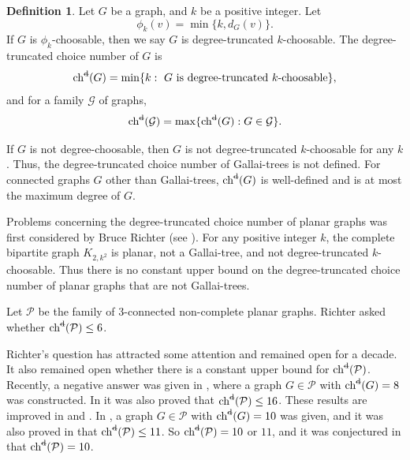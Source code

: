 \documentclass[11pt,a4paper]{article}
\theoremstyle{definition}
\newtheorem{definition}{Definition}
\begin{document}
 
 

 


\begin{definition}
    \label{def-degree-truncated}
    Let $G$ be a graph, and $k$ be a positive integer. Let 
$$\phi_k(v)=\min\{k, d_G(v)\}.$$
If  $G$ is  $\phi_k$-choosable, then we   say  $G$ is  degree-truncated $k$-choosable. 
    The  degree-truncated choice number of $G$ is 
$$\operatorname{ch}^{\text{\st{d}}}(G)= \min\{k:\text{ $G$ is degree-truncated  $k$-choosable}\},$$ 
and for 
a family  $ \mathcal{G}$ of graphs, $$\operatorname{ch}^{\text{\st{d}}}(\mathcal{G}) = \max \{\operatorname{ch}^{\text{\st{d}}}(G): G \in \mathcal{G}\}.$$
\end{definition}

 If $G$ is not degree-choosable, then $G$ is not degree-truncated $k$-choosable for any $k$. Thus, the degree-truncated choice number of Gallai-trees is not defined. For connected graphs $G$ other than Gallai-trees, $\operatorname{ch}^{\text{\st{d}}}(G)$ is well-defined and is at most the maximum degree of $G$.  

 
Problems concerning the degree-truncated choice number of planar graphs was first considered by Bruce Richter (see \cite{Hutchinson}). For any positive integer $k$, the complete bipartite graph $K_{2, k^2}$ is planar, not a Gallai-tree, and not degree-truncated $k$-choosable. Thus there is no constant upper bound on the degree-truncated choice number of planar graphs that are not Gallai-trees.  

Let $\mathcal{P}$ be the family of 3-connected non-complete planar graphs. Richter \cite{Hutchinson} asked whether $\operatorname{ch}^{\text{\st{d}}}(\mathcal{P}) \le 6$. 

Richter's question has attracted some attention \cite{Hutchinson,CPTV} and remained open for a decade. It also remained open whether there is a constant upper bound for $\operatorname{ch}^{\text{\st{d}}}(\mathcal{P})$. Recently,  a  negative answer was given in \cite{ZZZ25}, where a graph $G \in \mathcal{P}$ with $\operatorname{ch}^{\text{\st{d}}}(G) = 8$ was constructed. In \cite{ZZZ25} it was also proved that $\operatorname{ch}^{\text{\st{d}}}(\mathcal{P}) \le 16$.
These results are improved in \cite{JXXZ} and \cite{XZZZ}. In \cite{XZZZ}, a graph $G \in \mathcal{P}$ with $\operatorname{ch}^{\text{\st{d}}}(G) = 10$ was given, and it was also proved in   \cite{XZZZ} that  
$\operatorname{ch}^{\text{\st{d}}}(\mathcal{P}) \le 11$. 
So $\operatorname{ch}^{\text{\st{d}}}(\mathcal{P})=10$ or $11$, and it was conjectured in \cite{XZZZ}
that $\operatorname{ch}^{\text{\st{d}}}(\mathcal{P})=10$.  
\end{document}
